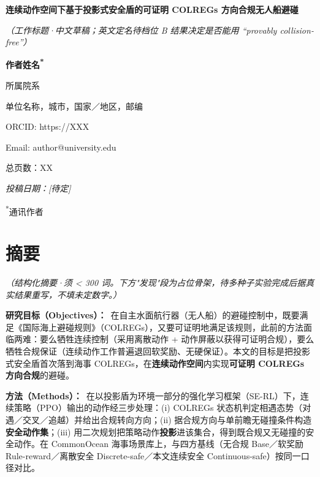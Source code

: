 \documentclass[12pt,letterpaper]{article}
\newcommand{\abshead}[1]{\textbf{#1}\ }
\begin{document}
\begin{flushleft}
{\bfseries 连续动作空间下基于投影式安全盾的可证明 COLREGs 方向合规无人船避碰}\par
{\itshape（工作标题·中文草稿；英文定名待档位 B 结果决定是否能用 “provably collision-free”）}\par
\vspace{12pt}

{\bfseries 作者姓名\textsuperscript{*}}\par
所属院系\par
单位名称，城市，国家／地区，邮编\par
ORCID: https://XXX\par
Email: author@university.edu\par
\vspace{12pt}

总页数：XX\par
\vspace{12pt}

\textit{投稿日期：[待定]}\par
\textsuperscript{*}通讯作者\par
\end{flushleft}

\vspace{6pt}

\section{摘要}
\noindent\textit{（结构化摘要·须 < 300 词。下方"发现"段为占位骨架，待多种子实验完成后据真实结果重写，不填未定数字。）}

\justifying

\abshead{研究目标（Objectives）：}在自主水面航行器（无人船）的避碰控制中，既要满足《国际海上避碰规则》（COLREGs），又要可证明地满足该规则，此前的方法面临两难：要么牺牲连续控制（采用离散动作 + 动作屏蔽以获得可证明合规），要么牺牲合规保证（连续动作工作普遍退回软奖励、无硬保证）。本文的目标是把投影式安全盾首次落到海事 COLREGs，在\textbf{连续动作空间}内实现\textbf{可证明 COLREGs 方向合规}的避碰。

\abshead{方法（Methods）：}在以投影盾为环境一部分的强化学习框架（SE-RL）下，连续策略（PPO）输出的动作经三步处理：(i) COLREGs 状态机判定相遇态势（对遇／交叉／追越）并给出合规转向方向；(ii) 据合规方向与单前瞻无碰撞条件构造\textbf{安全动作集}；(iii) 用二次规划把策略动作\textbf{投影}进该集合，得到既合规又无碰撞的安全动作。在 CommonOcean 海事场景库上，与四方基线（无合规 Base／软奖励 Rule-reward／离散安全 Discrete-safe／本文连续安全 Continuous-safe）按同一口径对比。
\end{document}

